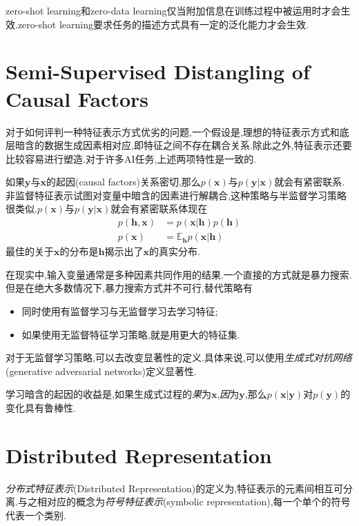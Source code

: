 zero-shot learning和zero-data learning仅当附加信息在训练过程中被运用时才会生效.zero-shot learning要求任务的描述方式具有一定的泛化能力才会生效.

\section{Semi-Supervised Distangling of Causal Factors}

对于如何评判一种特征表示方式优劣的问题,一个假设是,理想的特征表示方式和底层暗含的数据生成因素相对应,即特征之间不存在耦合关系.除此之外,特征表示还要比较容易进行塑造.对于许多AI任务,上述两项特性是一致的.

如果$\mathbf y$与$\mathbf x$的起因(causal factors)关系密切,那么$p(\mathbf x)$与$p(\mathbf{y|x})$就会有紧密联系.非监督特征表示试图对变量中暗含的因素进行解耦合,这种策略与半监督学习策略很类似.$p(\mathbf x)$与$p(\mathbf{y|x})$就会有紧密联系体现在
\begin{equation}\begin{split}
p(\mathbf {h,x})&=p(\mathbf{x|h})p(\mathbf h)\\
p(\mathbf x)&=\mathbb E_{\mathbf h}p(\mathbf{x|h})
\end{split}\end{equation}
最佳的关于$\mathbf x$的分布是$\mathbf h$揭示出了$\mathbf x$的真实分布.

在现实中,输入变量通常是多种因素共同作用的结果.一个直接的方式就是暴力搜索.但是在绝大多数情况下,暴力搜索方式并不可行,替代策略有
\begin{itemize}
    \item 同时使用有监督学习与无监督学习去学习特征;
    \item 如果使用无监督特征学习策略,就是用更大的特征集.
\end{itemize}

对于无监督学习策略,可以去改变显著性的定义.具体来说,可以使用\textit{生成式对抗网络}(generative adversarial networks)定义显著性.

学习暗含的起因的收益是,如果生成式过程的\textit{果}为$\mathbf x$,\textit{因}为$\mathbf y$,那么$p(\mathbf{x|y})$对$p(\mathbf y)$的变化具有鲁棒性.

\section{Distributed Representation}

\textit{分布式特征表示}(Distributed Representation)的定义为,特征表示的元素间相互可分离.与之相对应的概念为\textit{符号特征表示}(symbolic representation),每一个单个的符号代表一个类别.

